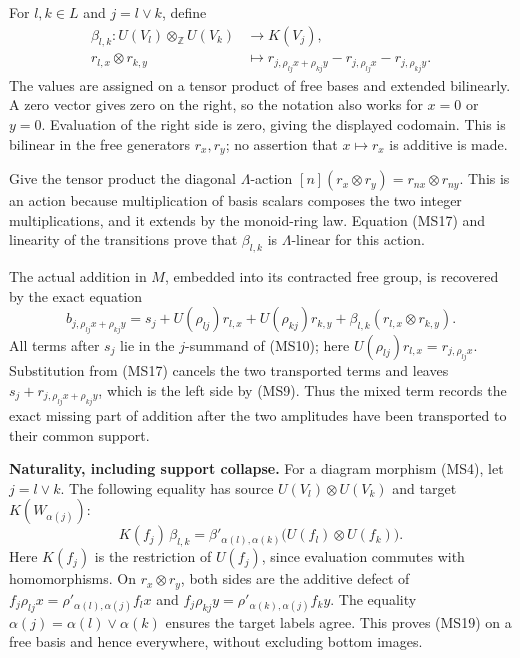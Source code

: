 \documentclass[
]{article}
\begin{document}
For \(l,k\in L\) and \(j=l\vee k\), define \[
\begin{split}
\beta_{l,k}:U(V_l)\otimes_{\mathbb Z}U(V_k)&\longrightarrow K(V_j),\\
r_{l,x}\otimes r_{k,y}&\longmapsto
r_{j,\rho_{lj}x+\rho_{kj}y}
-r_{j,\rho_{lj}x}-r_{j,\rho_{kj}y}.
\end{split}
\tag{MS17}
\] The values are assigned on a tensor product of free bases and
extended bilinearly. A zero vector gives zero on the right, so the
notation also works for \(x=0\) or \(y=0\). Evaluation of the right side
is zero, giving the displayed codomain. This is bilinear in the free
generators \(r_x,r_y\); no assertion that \(x\mapsto r_x\) is additive
is made.

Give the tensor product the diagonal \(\Lambda\)-action
\([n](r_x\otimes r_y)=r_{nx}\otimes r_{ny}\). This is an action because
multiplication of basis scalars composes the two integer
multiplications, and it extends by the monoid-ring law. Equation (MS17)
and linearity of the transitions prove that \(\beta_{l,k}\) is
\(\Lambda\)-linear for this action.

The actual addition in \(M\), embedded into its contracted free group,
is recovered by the exact equation \[
b_{j,\rho_{lj}x+\rho_{kj}y}
=s_j+U(\rho_{lj})r_{l,x}+U(\rho_{kj})r_{k,y}
+\beta_{l,k}(r_{l,x}\otimes r_{k,y}).
\tag{MS18}
\] All terms after \(s_j\) lie in the \(j\)-summand of (MS10); here
\(U(\rho_{lj})r_{l,x}=r_{j,\rho_{lj}x}\). Substitution from (MS17)
cancels the two transported terms and leaves
\(s_j+r_{j,\rho_{lj}x+\rho_{kj}y}\), which is the left side by (MS9).
Thus the mixed term records the exact missing part of addition after the
two amplitudes have been transported to their common support.

\textbf{Naturality, including support collapse.} For a diagram morphism
(MS4), let \(j=l\vee k\). The following equality has source
\(U(V_l)\otimes U(V_k)\) and target \(K(W_{\alpha(j)})\): \[
K(f_j)\,\beta_{l,k}
=\beta'_{\alpha(l),\alpha(k)}
\bigl(U(f_l)\otimes U(f_k)\bigr).
\tag{MS19}
\] Here \(K(f_j)\) is the restriction of \(U(f_j)\), since evaluation
commutes with homomorphisms. On \(r_x\otimes r_y\), both sides are the
additive defect of \(f_j\rho_{lj}x=\rho'_{\alpha(l),\alpha(j)}f_lx\) and
\(f_j\rho_{kj}y=\rho'_{\alpha(k),\alpha(j)}f_ky\). The equality
\(\alpha(j)=\alpha(l)\vee\alpha(k)\) ensures the target labels agree.
This proves (MS19) on a free basis and hence everywhere, without
excluding bottom images.
\end{document}
